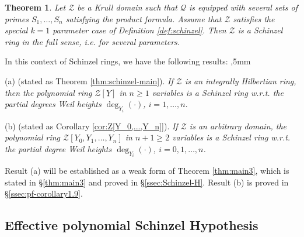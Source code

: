 \documentclass[11pt,a4paper,reqno]{amsart}
\newtheorem{thm}{Theorem}[section]
\theoremstyle{definition}
\begin{document}






\begin{thm} \label{thm:schinzel1=>Schinzelk}
Let $\mathcal{Z}$ be a Krull domain such that $\mathcal Q$ is equipped with several sets of primes $S_1,\dots,S_n$ satisfying the product formula. Assume that $\mathcal{Z}$ satisfies the special $k=1$ parameter case of Definition \ref{def:schinzel}. Then $\mathcal{Z}$ is a Schinzel ring in the full sense, \hbox{i.e.} for several parameters. 
\end{thm}


\vskip 1mm

In this context of Schinzel rings, we have the following results:
,5mm

\noindent
(a) (stated as Theorem \ref{thm:schinzel-main}). \emph{If ${\mathcal Z}$ is an integrally Hilbertian ring, then the polynomial ring ${\mathcal Z}[\underline Y]$ in $n\geq 1$ variables is a Schinzel ring \hbox{w.r.t.} the partial degrees Weil heights $\deg_{Y_i}(\cdot)$, $i=1,\ldots,n$}.
\vskip 1mm


\noindent
(b) (stated as Corollary \ref{cor:Z[Y_0,...,Y_n]}). \emph{If ${\mathcal Z}$ is an arbitrary domain, the polynomial ring ${\mathcal Z}[Y_0,Y_1,\ldots,Y_n]$ in $n+1 \geq 2$ variables is a Schinzel ring \hbox{w.r.t.} the partial degree Weil heights $\deg_{Y_i}(\cdot)$, $i=0,1,\ldots,n$.} 
\vskip 1mm

\noindent
Result (a) will be established as a weak form of Theorem \ref{thm:main3}, which is stated in \S \ref{thm:main3} and proved in \S \ref{ssec:Schinzel-H}. Result (b) is proved in \S \ref{ssec:pf-corollary1.9}. 








\subsection{Effective polynomial Schinzel Hypothesis} \label{SchH-general}
\end{document}
